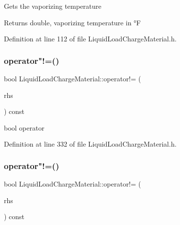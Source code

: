 Gets the vaporizing temperature \begin{DoxyReturn}{Returns}
double, vaporizing temperature in °F 
\end{DoxyReturn}


Definition at line 112 of file Liquid\+Load\+Charge\+Material.\+h.

\mbox{\label{class_liquid_load_charge_material_aa6ad825ee8ab1c7816ce3bf10260c0bb}} 
\subsubsection{\texorpdfstring{operator"!=()}{operator!=()}\hspace{0.1cm}{\footnotesize\ttfamily [1/3]}}
{\footnotesize\ttfamily bool Liquid\+Load\+Charge\+Material\+::operator!= (\begin{DoxyParamCaption}\item[{const \hyperlink{class_liquid_load_charge_material}{Liquid\+Load\+Charge\+Material} \&}]{rhs }\end{DoxyParamCaption}) const\hspace{0.3cm}{\ttfamily [inline]}}

bool operator 

Definition at line 332 of file Liquid\+Load\+Charge\+Material.\+h.

\mbox{\label{class_liquid_load_charge_material_aa6ad825ee8ab1c7816ce3bf10260c0bb}} 
\subsubsection{\texorpdfstring{operator"!=()}{operator!=()}\hspace{0.1cm}{\footnotesize\ttfamily [2/3]}}
{\footnotesize\ttfamily bool Liquid\+Load\+Charge\+Material\+::operator!= (\begin{DoxyParamCaption}\item[{const \hyperlink{class_liquid_load_charge_material}{Liquid\+Load\+Charge\+Material} \&}]{rhs }\end{DoxyParamCaption}) const\hspace{0.3cm}{\ttfamily [inline]}}

